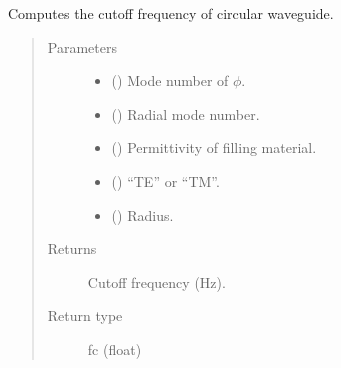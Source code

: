 \documentclass[letterpaper,10pt,english]{sphinxmanual}
\begin{document}

\begin{fulllineitems}
\label{\detokenize{components:components.fcutoff_CWG}}
Computes the cutoff frequency of circular waveguide.
\begin{quote}\begin{description}
\item[{Parameters}] \leavevmode\begin{itemize}
\item {} 
 () \textendash{} Mode number of \(\phi\).

\item {} 
 () \textendash{} Radial mode number.

\item {} 
 () \textendash{} Permittivity of filling material.

\item {} 
 () \textendash{} “TE” or “TM”.

\item {} 
 () \textendash{} Radius.

\end{itemize}

\item[{Returns}] \leavevmode
Cutoff frequency (Hz).

\item[{Return type}] \leavevmode
fc (float)

\end{description}\end{quote}

\end{fulllineitems}
\end{document}
